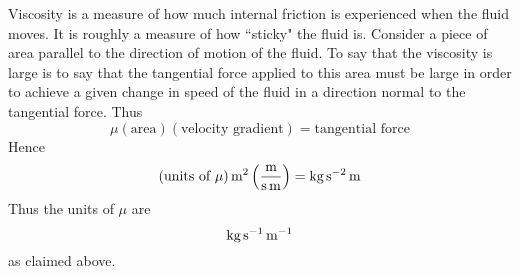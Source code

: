 Viscosity is a measure of how much internal friction is experienced when the
fluid moves. It is roughly a measure of how \textquotedblleft sticky" the
fluid is. Consider a piece of area parallel to the direction of motion of
the fluid. To say that the viscosity is large is to say that the tangential
force applied to this area must be large in order to achieve a given change
in speed of the fluid in a direction normal to the tangential force. Thus 
\begin{equation*}
\mu \left( \text{area}\right) \left( \text{velocity gradient}\right) =\text{
tangential force}
\end{equation*}
Hence 
\begin{equation*}
\left( \mbox{units of $\mu$} \right) \mathop{\textrm{\rm m}}\nolimits^{2}\left( \frac{\mathop{\textrm{\rm m}}\nolimits}{\mathop{\textrm{\rm s}}\nolimits \mathop{\textrm{\rm m}}\nolimits}\right)
=\mathop{\textrm{\rm kg}}\nolimits\mathop{\textrm{\rm s}}\nolimits ^{-2}\mathop{\textrm{\rm m}}\nolimits
\end{equation*}
Thus the units of $\mu $ are 
\begin{equation*}
\mathop{\textrm{\rm kg}}\nolimits\mathop{\textrm{\rm s}}\nolimits ^{-1}\mathop{\textrm{\rm m}}\nolimits^{-1}
\end{equation*}
as claimed above.

